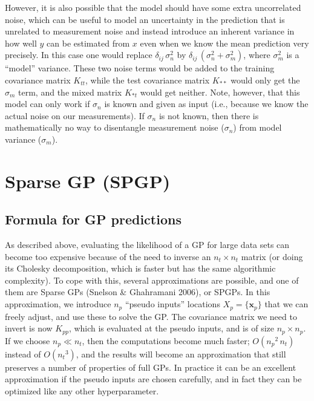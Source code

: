 \documentclass[11pt,a4paper]{article}
\numberwithin{equation}{section}
\begin{document}
However, it is also possible that the model should have some extra uncorrelated noise, which can be useful to model an uncertainty in the prediction that is unrelated to measurement noise and instead introduce an inherent variance in how well $y$ can be estimated from $x$ even when we know the mean prediction very precisely. In this case one would replace $\delta_{ij}\,\sigma_n^2$ by $\delta_{ij}\,(\sigma_n^2 + \sigma_m^2)$, where $\sigma_m^2$ is a ``model'' variance. These two noise terms would be added to the training covariance matrix $K_{tt}$, while the test covariance matrix $K_{**}$ would only get the $\sigma_m$ term, and the mixed matrix $K_{*t}$ would get neither. Note, however, that this model can only work if $\sigma_n$ is known and given as input (i.e., because we know the actual noise on our measurements). If $\sigma_n$ is not known, then there is mathematically no way to disentangle measurement noise ($\sigma_n$) from model variance ($\sigma_m$).

\section{Sparse GP (SPGP)}

\subsection{Formula for GP predictions}

As described above, evaluating the likelihood of a GP for large data sets can become too expensive because of the need to inverse an $n_t \times n_t$ matrix (or doing its Cholesky decomposition, which is faster but has the same algorithmic complexity). To cope with this, several approximations are possible, and one of them are Sparse GPs (Snelson \& Ghahramani 2006), or SPGPs. In this approximation, we introduce $n_p$ ``pseudo inputs'' locations $X_p = \{\mathbf{x}_p\}$ that we can freely adjust, and use these to solve the GP. The covariance matrix we need to invert is now $K_{pp}$, which is evaluated at the pseudo inputs, and is of size $n_p \times n_p$. If we choose $n_p \ll n_t$, then the computations become much faster; $O({n_p}^2\,n_t)$ instead of $O({n_t}^3)$, and the results will become an approximation that still preserves a number of properties of full GPs. In practice it can be an excellent approximation if the pseudo inputs are chosen carefully, and in fact they can be optimized like any other hyperparameter.
\end{document}
